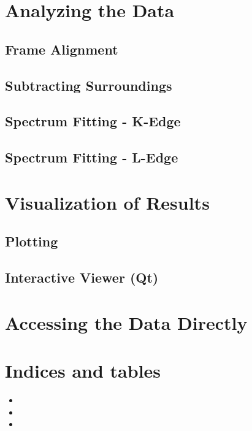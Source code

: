 \documentclass[letterpaper,10pt,english]{sphinxmanual}
\begin{document}
\chapter{Analyzing the Data}
\label{\detokenize{analysis::doc}}\label{\detokenize{analysis:analyzing-the-data}}

\section{Frame Alignment}
\label{\detokenize{analysis:frame-alignment}}

\section{Subtracting Surroundings}
\label{\detokenize{analysis:subtracting-surroundings}}

\section{Spectrum Fitting - K-Edge}
\label{\detokenize{analysis:spectrum-fitting-k-edge}}

\section{Spectrum Fitting - L-Edge}
\label{\detokenize{analysis:spectrum-fitting-l-edge}}

\chapter{Visualization of Results}
\label{\detokenize{visualization::doc}}\label{\detokenize{visualization:visualization-of-results}}

\section{Plotting}
\label{\detokenize{visualization:plotting}}

\section{Interactive Viewer (Qt)}
\label{\detokenize{visualization:interactive-viewer-qt}}

\chapter{Accessing the Data Directly}
\label{\detokenize{data_stores:accessing-the-data-directly}}\label{\detokenize{data_stores::doc}}

\chapter{Indices and tables}
\label{\detokenize{index:indices-and-tables}}\begin{itemize}
\item {} 

\item {} 

\item {} 

\end{itemize}



\renewcommand{\indexname}{Index}
\printindex
\end{document}
